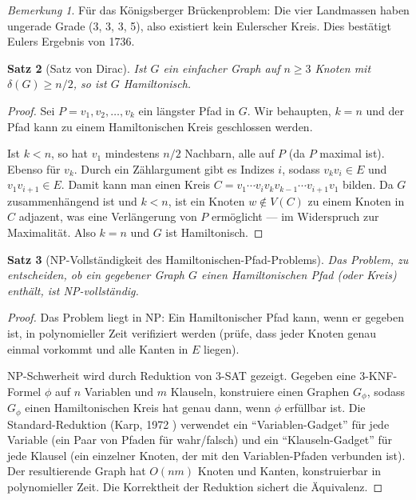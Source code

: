 \documentclass[12pt,a4paper]{amsart}
\newtheorem{theorem}{Satz}[section]
\theoremstyle{definition}
\theoremstyle{remark}
\newtheorem{remark}[theorem]{Bemerkung}
\begin{document}
\begin{remark}
Für das Königsberger Brückenproblem: Die vier Landmassen haben ungerade Grade
(3, 3, 3, 5), also existiert kein Eulerscher Kreis. Dies bestätigt Eulers
Ergebnis von 1736.
\end{remark}

\begin{theorem}[Satz von Dirac]
\label{satz:dirac}
Ist $G$ ein einfacher Graph auf $n \ge 3$ Knoten mit $\delta(G) \ge n/2$,
so ist $G$ Hamiltonisch.
\end{theorem}

\begin{proof}
Sei $P = v_1, v_2, \ldots, v_k$ ein längster Pfad in $G$. Wir behaupten,
$k = n$ und der Pfad kann zu einem Hamiltonischen Kreis geschlossen werden.

Ist $k < n$, so hat $v_1$ mindestens $n/2$ Nachbarn, alle auf $P$ (da $P$
maximal ist). Ebenso für $v_k$. Durch ein Zählargument gibt es Indizes $i$,
sodass $v_k v_i \in E$ und $v_1 v_{i+1} \in E$. Damit kann man einen Kreis
$C = v_1 \cdots v_i v_k v_{k-1} \cdots v_{i+1} v_1$ bilden. Da $G$
zusammenhängend ist und $k < n$, ist ein Knoten $w \notin V(C)$ zu einem
Knoten in $C$ adjazent, was eine Verlängerung von $P$ ermöglicht --- im
Widerspruch zur Maximalität. Also $k = n$ und $G$ ist Hamiltonisch.
\end{proof}

\begin{theorem}[NP-Vollständigkeit des Hamiltonischen-Pfad-Problems]
\label{satz:ham-np}
Das Problem, zu entscheiden, ob ein gegebener Graph $G$ einen Hamiltonischen
Pfad (oder Kreis) enthält, ist NP-vollständig.
\end{theorem}

\begin{proof}
Das Problem liegt in NP: Ein Hamiltonischer Pfad kann, wenn er gegeben ist,
in polynomieller Zeit verifiziert werden (prüfe, dass jeder Knoten genau
einmal vorkommt und alle Kanten in $E$ liegen).

NP-Schwerheit wird durch Reduktion von 3-SAT gezeigt. Gegeben eine
3-KNF-Formel $\phi$ auf $n$ Variablen und $m$ Klauseln, konstruiere einen
Graphen $G_\phi$, sodass $G_\phi$ einen Hamiltonischen Kreis hat genau dann,
wenn $\phi$ erfüllbar ist. Die Standard-Reduktion (Karp, 1972 \cite{karp1972})
verwendet ein ``Variablen-Gadget'' für jede Variable (ein Paar von Pfaden
für wahr/falsch) und ein ``Klauseln-Gadget'' für jede Klausel (ein einzelner
Knoten, der mit den Variablen-Pfaden verbunden ist). Der resultierende Graph
hat $O(nm)$ Knoten und Kanten, konstruierbar in polynomieller Zeit. Die
Korrektheit der Reduktion sichert die Äquivalenz.
\end{proof}
\end{document}
